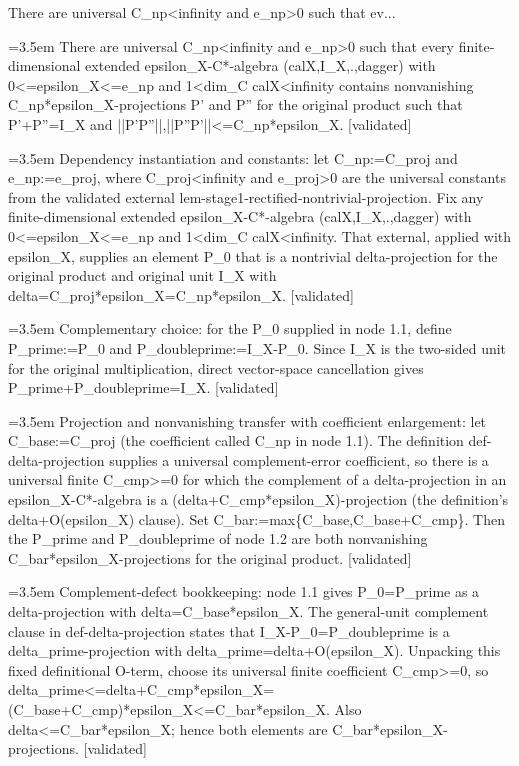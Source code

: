 \documentclass{article}
\newcommand{\step}[1]{\par\noindent\hangindent=3.5em\hangafter=1%
  \makebox[3.5em][l]{\textbf{#1.}}}
\newcommand{\steptag}[1]{\hfill{\small\textsf{[#1]}}}
\begin{document}
\begin{proofbox}{There are universal C\_np<infinity and e\_np>0 such that ev...}
\step{1} There are universal C\_np<infinity and e\_np>0 such that every finite-dimensional extended epsilon\_X-C*-algebra (calX,I\_X,.,dagger) with 0<=epsilon\_X<=e\_np and 1<dim\_C calX<infinity contains nonvanishing C\_np*epsilon\_X-projections P' and P'' for the original product such that P'+P''=I\_X and ||P'P''||,||P''P'||<=C\_np*epsilon\_X. \steptag{validated} \\[6pt]
\step{1.1} Dependency instantiation and constants: let C\_np:=C\_proj and e\_np:=e\_proj, where C\_proj<infinity and e\_proj>0 are the universal constants from the validated external lem-stage1-rectified-nontrivial-projection. Fix any finite-dimensional extended epsilon\_X-C*-algebra (calX,I\_X,.,dagger) with 0<=epsilon\_X<=e\_np and 1<dim\_C calX<infinity. That external, applied with epsilon\_X, supplies an element P\_0 that is a nontrivial delta-projection for the original product and original unit I\_X with delta=C\_proj*epsilon\_X=C\_np*epsilon\_X. \steptag{validated} \\[4pt]
\step{1.2} Complementary choice: for the P\_0 supplied in node 1.1, define P\_prime:=P\_0 and P\_doubleprime:=I\_X-P\_0. Since I\_X is the two-sided unit for the original multiplication, direct vector-space cancellation gives P\_prime+P\_doubleprime=I\_X. \steptag{validated} \\[4pt]
\step{1.3} Projection and nonvanishing transfer with coefficient enlargement: let C\_base:=C\_proj (the coefficient called C\_np in node 1.1). The definition def-delta-projection supplies a universal complement-error coefficient, so there is a universal finite C\_cmp>=0 for which the complement of a delta-projection in an epsilon\_X-C*-algebra is a (delta+C\_cmp*epsilon\_X)-projection (the definition's delta+O(epsilon\_X) clause). Set C\_bar:=max\{C\_base,C\_base+C\_cmp\}. Then the P\_prime and P\_doubleprime of node 1.2 are both nonvanishing C\_bar*epsilon\_X-projections for the original product. \steptag{validated} \\[6pt]
\step{1.3.1} Complement-defect bookkeeping: node 1.1 gives P\_0=P\_prime as a delta-projection with delta=C\_base*epsilon\_X. The general-unit complement clause in def-delta-projection states that I\_X-P\_0=P\_doubleprime is a delta\_prime-projection with delta\_prime=delta+O(epsilon\_X). Unpacking this fixed definitional O-term, choose its universal finite coefficient C\_cmp>=0, so delta\_prime<=delta+C\_cmp*epsilon\_X=(C\_base+C\_cmp)*epsilon\_X<=C\_bar*epsilon\_X. Also delta<=C\_bar*epsilon\_X; hence both elements are C\_bar*epsilon\_X-projections. \steptag{validated} \\[4pt]

\end{proofbox}
\end{document}
